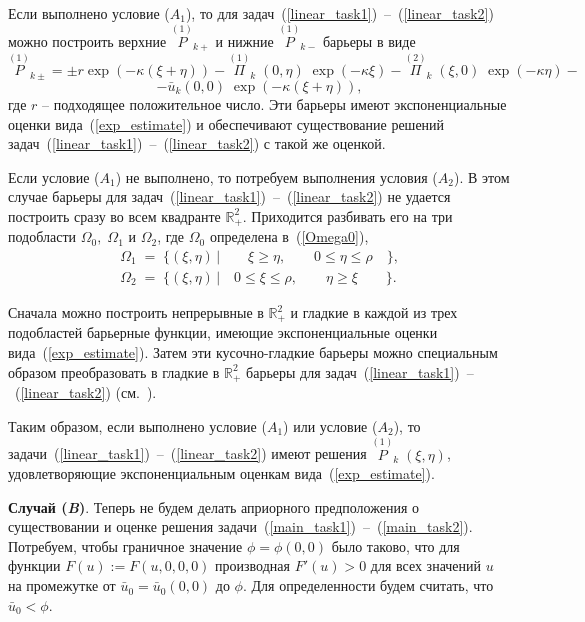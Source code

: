 \documentclass[12pt]{article}
\begin{document}
Если выполнено условие (\textit{$A_1$}), то для задач~(\ref {linear_task1})~--~(\ref {linear_task2}) можно построить верхние $\overset{(1)}{P}_{k+}$ и нижние $\overset{(1)}{P}_{k-}$ барьеры в виде
\begin{equation*}
	\overset{(1)}{P}_{k\pm} = \pm r \exp (-\kappa (\xi + \eta)) - \overset{(1)}{\Pi}_k \; (0, \eta) \; \exp (-\kappa \xi) - 
\overset{(2)}{\Pi}_k \; (\xi, 0) \; \exp (-\kappa \eta) -
\end{equation*}
\begin{equation*}
	- \bar u_k(0, 0) \; \exp(-\kappa (\xi + \eta)),
\end{equation*}
где $r$ -- подходящее положительное число. Эти барьеры имеют экспоненциальные оценки вида~(\ref{exp_estimate}) и обеспечивают существование решений задач~(\ref {linear_task1})~--~(\ref {linear_task2}) с такой же оценкой.

Если условие (\textit{$A_1$}) не выполнено, то потребуем выполнения условия (\textit{$A_2$}). В этом случае барьеры для задач~(\ref {linear_task1})~--~(\ref {linear_task2}) не удается построить сразу во всем квадранте $\mathbb{R}_+^2$. Приходится разбивать его на три подобласти $\Omega_0, \; \Omega_1$ и $\Omega_2$, где $\Omega_0$ определена в~(\ref{Omega0}),
\begin{gather*}
	\Omega_1 \; = \; \{ (\xi, \eta) \, | \qquad \xi \ge \eta, \qquad 0 \le \eta \le \rho \quad \}, \\
	\Omega_2 \; = \; \{ (\xi, \eta) \, | \quad 0 \le \xi \le \rho, \qquad \eta \ge \xi \qquad \}.
\end{gather*}

Сначала можно построить непрерывные в $\mathbb{R}_+^2$ и гладкие в каждой из трех подобластей барьерные функции, имеющие экспоненциальные оценки вида~(\ref{exp_estimate}). Затем эти кусочно-гладкие барьеры можно специальным образом преобразовать в гладкие в $\mathbb{R}_+^2$ барьеры для задач~(\ref {linear_task1})~--~(\ref {linear_task2}) (см.~\cite{denisov2}).

Таким образом, если выполнено условие (\textit{$A_1$}) или условие (\textit{$A_2$}), то задачи~(\ref {linear_task1})~--~(\ref {linear_task2}) имеют решения 
$\overset{(1)}{P}_k \; (\xi, \eta)$, удовлетворяющие экспоненциальным оценкам вида~(\ref{exp_estimate}).

{\bf Случай (\textit{B})}. Теперь не будем делать априорного предположения о существовании и оценке решения задачи~(\ref {main_task1})~--~(\ref {main_task2}). Потребуем, чтобы граничное значение $\phi = \phi(0, 0)$ было таково, что для функции $F(u) := F(u, 0, 0, 0)$ производная $F'(u) > 0$ для всех значений $u$ на промежутке от $\bar u_0 = \bar u_0(0, 0)$ до $\phi$. Для определенности будем считать, что $\bar u_0 < \phi$.
\end{document}
